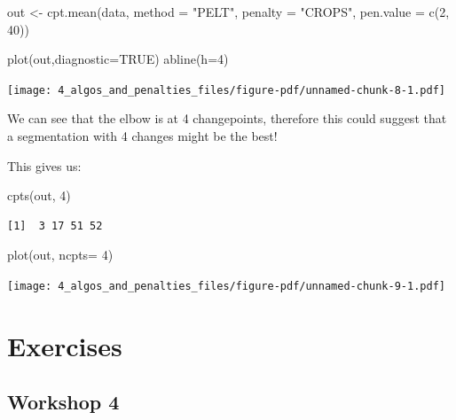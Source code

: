 \documentclass[
  letterpaper,
  DIV=11,
  numbers=noendperiod]{scrreprt}
\newenvironment{Shaded}{\begin{snugshade}}{\end{snugshade}}
\newcommand{\AttributeTok}[1]{\textcolor[rgb]{0.40,0.45,0.13}{#1}}
\newcommand{\ConstantTok}[1]{\textcolor[rgb]{0.56,0.35,0.01}{#1}}
\newcommand{\DecValTok}[1]{\textcolor[rgb]{0.68,0.00,0.00}{#1}}
\newcommand{\FunctionTok}[1]{\textcolor[rgb]{0.28,0.35,0.67}{#1}}
\newcommand{\NormalTok}[1]{\textcolor[rgb]{0.00,0.23,0.31}{#1}}
\newcommand{\OtherTok}[1]{\textcolor[rgb]{0.00,0.23,0.31}{#1}}
\newcommand{\StringTok}[1]{\textcolor[rgb]{0.13,0.47,0.30}{#1}}
\begin{document}
\begin{Shaded}
\begin{Highlighting}[]
\NormalTok{out }\OtherTok{\textless{}{-}} \FunctionTok{cpt.mean}\NormalTok{(data, }\AttributeTok{method =} \StringTok{"PELT"}\NormalTok{, }\AttributeTok{penalty  =} \StringTok{"CROPS"}\NormalTok{, }\AttributeTok{pen.value =} \FunctionTok{c}\NormalTok{(}\DecValTok{2}\NormalTok{, }\DecValTok{40}\NormalTok{))}

\FunctionTok{plot}\NormalTok{(out,}\AttributeTok{diagnostic=}\ConstantTok{TRUE}\NormalTok{)}
\FunctionTok{abline}\NormalTok{(}\AttributeTok{h=}\DecValTok{4}\NormalTok{)}
\end{Highlighting}
\end{Shaded}

\texttt{[image: 4\_algos\_and\_penalties\_files/figure-pdf/unnamed-chunk-8-1.pdf]}

We can see that the elbow is at 4 changepoints, therefore this could
suggest that a segmentation with 4 changes might be the best!

This gives us:

\begin{Shaded}
\begin{Highlighting}[]
\FunctionTok{cpts}\NormalTok{(out, }\DecValTok{4}\NormalTok{)}
\end{Highlighting}
\end{Shaded}

\begin{verbatim}
[1]  3 17 51 52
\end{verbatim}

\begin{Shaded}
\begin{Highlighting}[]
\FunctionTok{plot}\NormalTok{(out, }\AttributeTok{ncpts=} \DecValTok{4}\NormalTok{)}
\end{Highlighting}
\end{Shaded}

\texttt{[image: 4\_algos\_and\_penalties\_files/figure-pdf/unnamed-chunk-9-1.pdf]}

\section{Exercises}\label{exercises-3}

\subsection{Workshop 4}\label{workshop-4}
\end{document}
